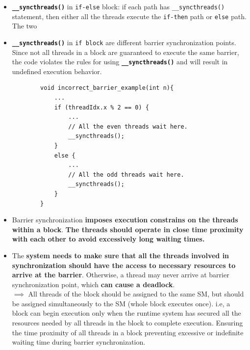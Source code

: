 \begin{itemize}
    \item \textbf{\texttt{\_\_syncthreads()}} in \texttt{if-else} block: if each path has \texttt{\_\_syncthreads()} statement, then either all the threads execute the \texttt{if-then} path or \texttt{else} path. The two \item \textbf{\texttt{\_\_syncthreads()}} in \texttt{if block} are different barrier synchronization points. Since not all threads in a block are guaranteed to execute the same barrier, the code violates the rules for using \textbf{\texttt{\_\_syncthreads()}} and will result in undefined execution behavior.
          \begin{verbatim}
        void incorrect_barrier_example(int n){
            ...
            if (threadIdx.x % 2 == 0) {
                ...
                // All the even threads wait here. 
                __syncthreads();
            }
            else {
                ...
                // All the odd threads wait here. 
                __syncthreads();
            }
        }
    \end{verbatim}
    \item Barrier synchronization \textbf{imposes execution constrains on the threads within a block}. \textbf{The threads should operate in close time proximity with each other to avoid excessively long waiting times.}
    \item The \textbf{system needs to make sure that all the threads involved in synchronization should have the access to necessary resources to arrive at the barrier}. Otherwise, a thread may never arrive at barrier synchronization point, which \textbf{can cause a deadlock}.\\
          \linebreak
          $\implies$ All threads of the block should be assigned to the same SM, but should be assigned simultaneously to the SM (whole block executes once). i.e, a block can begin execution only when the runtime system has secured all the resources needed by all threads in the block to complete execution. Ensuring the time proximity of all threads in a block preventing excessive or indefinite waiting time during barrier synchronization.

\end{itemize}
